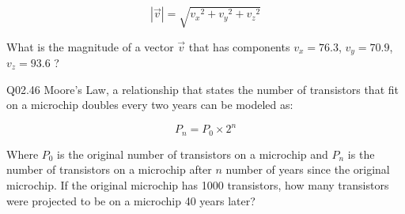 \documentclass{book}
\newenvironment{problems}{}{}  %
\begin{document}
\begin{problems}
\[ |\vec{v}| = \sqrt{{v_x}^2 + {v_y}^2 + {v_z}^2} \]

What is the magnitude of a vector \(\vec{v}\) that has components
\(v_x = 76.3\), \(v_y = 70.9\), \(v_z = 93.6\) ?

Q02.46 Moore's Law, a relationship that states the number of transistors
that fit on a microchip doubles every two years can be modeled as:

\[ P_n = P_0 \times 2^n \]

Where \(P_0\) is the original number of transistors on a microchip and
\(P_n\) is the number of transistors on a microchip after \(n\) number
of years since the original microchip. If the original microchip has
1000 transistors, how many transistors were projected to be on a
microchip 40 years later?
        \end{problems}

    
\end{document}
